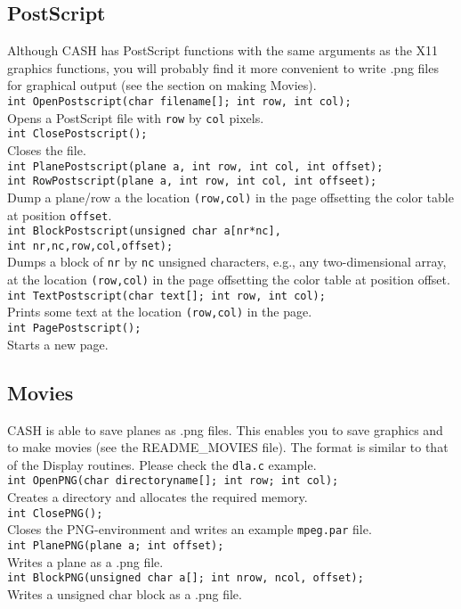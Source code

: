 \documentclass[12pt]{article}
\newcommand{\mtt}[1]{\texttt{\\#1\\}}
\begin{document}
\subsection{PostScript}
Although CASH has PostScript functions  
with the same arguments as the X11 graphics functions,
you will probably find it more convenient to write .png files
for graphical output (see the section on making Movies).
\mtt{ int OpenPostscript(char filename[]; int row, int col);}
Opens a PostScript file with {\tt row} by {\tt col} pixels.
\mtt{ int ClosePostscript();}
Closes the file.
\mtt{ 
int PlanePostscript(plane a, int row, int col, int offset);\\
int RowPostscript(plane a, int row, int col, int offseet);
}
Dump a plane/row a the location {\tt (row,col)} in the page offsetting
the color table at position {\tt offset}.
\mtt{ int BlockPostscript(unsigned char a[nr*nc],\\
int nr,nc,row,col,offset);}
Dumps a block of {\tt nr} by {\tt nc} unsigned characters,
e.g., any two-dimensional array, at the location {\tt (row,col)} in the page
offsetting the color table at position offset. 
\mtt{ int TextPostscript(char text[]; int row, int col);}
Prints some text at the location {\tt (row,col)}
in the page. 
\mtt{ int PagePostscript();}
Starts a new page.

\subsection{Movies}
CASH is able to save planes as .png files.  This enables
you to save graphics and to make movies (see the README\_MOVIES file).
The format is similar to that of the Display routines.
Please check the {\tt dla.c}  example.
\mtt{ int OpenPNG(char directoryname[]; int row; int col);}
Creates a directory and allocates the required memory. 
\mtt{ int ClosePNG();}
Closes the PNG-environment and writes an example {\tt mpeg.par} file.
\mtt{ int PlanePNG(plane a; int offset);}
Writes a plane as a .png file.
\mtt{ int BlockPNG(unsigned char a[]; int nrow, ncol, offset);}
Writes a unsigned char block as a .png file.
\end{document}
